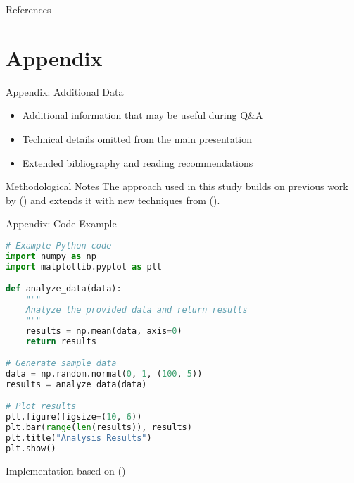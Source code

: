 \documentclass[aspectratio=169]{beamer}
\begin{document}
\begin{frame}[allowframebreaks]{References}
  \printbibliography
\end{frame}

\appendix
\section{Appendix}

\begin{frame}{Appendix: Additional Data}
  \begin{itemize}
    \item Additional information that may be useful during Q\&A
    \item Technical details omitted from the main presentation
    \item Extended bibliography and reading recommendations
  \end{itemize}
  
  \begin{block}{Methodological Notes}
    The approach used in this study builds on previous work by \citeauthor{Wang2018} (\citeyear{Wang2018}) and extends it with new techniques from \citeauthor{Chen2022} (\citeyear{Chen2022}).
  \end{block}
\end{frame}

\begin{frame}{Appendix: Code Example}
  \begin{lstlisting}[language=Python]
# Example Python code
import numpy as np
import matplotlib.pyplot as plt

def analyze_data(data):
    """
    Analyze the provided data and return results
    """
    results = np.mean(data, axis=0)
    return results

# Generate sample data
data = np.random.normal(0, 1, (100, 5))
results = analyze_data(data)

# Plot results
plt.figure(figsize=(10, 6))
plt.bar(range(len(results)), results)
plt.title("Analysis Results")
plt.show()
  \end{lstlisting}
  
  Implementation based on \citeauthor{Smith2020} (\citeyear{Smith2020})
\end{frame}
\end{document}
